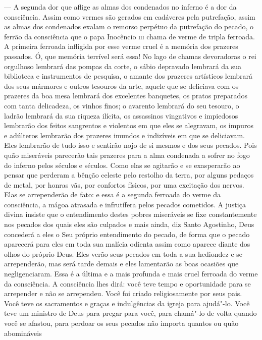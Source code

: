  --- A segunda dor que aflige as almas dos condenados no inferno é a dor da
consciência. Assim como vermes são gerados em cadáveres pela
putrefação, assim as almas dos condenados exalam o remorso perpétuo da
putrefação do pecado, o ferrão da consciência que o papa Inocêncio \textsc{iii}
chama de verme de tripla ferroada. A primeira ferroada infligida por
esse verme cruel é a memória dos prazeres passados. Ó, que memória
terrível será essa! No lago de chamas devoradoras o rei orgulhoso
lembrará das pompas da corte, o sábio depravado lembrará da sua
biblioteca e instrumentos de pesquisa, o amante dos prazeres artísticos
lembrará dos seus mármores e outros tesouros da arte, aquele que se
deliciava com os prazeres da boa mesa lembrará dos excelentes
banquetes, os pratos preparados com tanta delicadeza, os vinhos finos;
o avarento lembrará do seu tesouro, o ladrão lembrará da sua riqueza
ilícita, os assassinos vingativos e impiedosos lembrarão dos feitos
sangrentos e violentos em que eles se alegravam, os impuros e adúlteros
lembrarão dos prazeres imundos e indizíveis em que se deliciavam. Eles
lembrarão de tudo isso e sentirão nojo de si mesmos e dos seus pecados.
Pois quão miseráveis parecerão tais prazeres para a alma condenada a
sofrer no fogo do inferno pelos séculos e séculos. Como elas se
agitarão e se exasperarão ao pensar que perderam a bênção celeste pelo
restolho da terra, por alguns pedaços de metal, por honras vãs, por
confortos físicos, por uma excitação dos nervos. Elas se arrependerão
de fato: e essa é a segunda ferroada do verme da consciência, a mágoa
atrasada e infrutífera pelos pecados cometidos. A justiça divina
insiste que o entendimento destes pobres miseráveis se fixe
constantemente nos pecados dos quais eles são culpados e mais ainda,
diz Santo Agostinho, Deus concederá a eles o Seu próprio entendimento
do pecado, de forma que o pecado aparecerá para eles em toda sua
malícia odienta assim como aparece diante dos olhos do próprio Deus.
Eles verão seus pecados em toda a sua hediondez e se arrependerão, mas
será tarde demais e eles lamentarão as boas ocasiões que 
negligenciaram. Essa é a última e a mais profunda e mais cruel ferroada
do verme da consciência. A consciência lhes dirá: você teve tempo e
oportunidade para se arrepender e não se arrependeu. Você foi criado
religiosamente por seus pais. Você teve os sacramentos e graças e
indulgências da igreja para ajudá"-lo. Você teve um ministro de Deus
para pregar para você, para chamá"-lo de volta quando você se afastou,
para perdoar os seus pecados não importa quantos ou quão abomináveis
